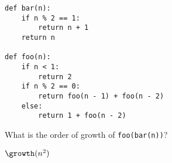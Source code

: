 \begin{blocksection}
\question \begin{lstlisting}
def bar(n):
    if n % 2 == 1:
        return n + 1
    return n

def foo(n):
    if n < 1:
        return 2
    if n % 2 == 0:
        return foo(n - 1) + foo(n - 2)
    else:
        return 1 + foo(n - 2)
\end{lstlisting}

What is the order of growth of {\tt foo(bar(n))}?

\begin{solution}[0.0in]
    $\growth(n^2)$
\end{solution}
\end{blocksection}
